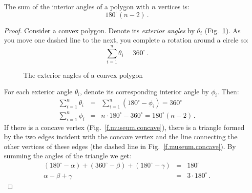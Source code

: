 \begin{theorem}\label{thm.interior-angles-of-a-polygon}
The sum of the interior angles of a polygon with $n$ vertices is:
\[180^\circ(n-2)\,.\]
\end{theorem}
\begin{proof}
Consider a convex polygon.
Denote its \emph{exterior angles} by $\theta_i$ (Fig.~\ref{f.museum.exterior}).
As you move one dashed line to the next, you complete a rotation around a circle so:
\[
\sum_{i=1}^n \theta_i = 360^\circ\,.
\]
\begin{figure}[t]
\begin{center}
\end{center}
\caption{The exterior angles of a convex polygon}\label{f.museum.exterior}
\end{figure}
For each exterior angle $\theta_i$, denote its corresponding interior angle by $\phi_i$. Then:
\begin{eqnarray*}
\displaystyle\sum_{i=1}^n \theta_i &=&\displaystyle\sum_{i=1}^n (180^\circ-\phi_i)= 360^\circ\\
\displaystyle\sum_{i=1}^n \phi_i &=& n\cdot 180^\circ-360^\circ =180^\circ(n-2)\,.
\end{eqnarray*}
If there is a concave vertex (Fig.~\ref{f.museum.concave}), there is a triangle formed by the two edges incident with the concave vertex and the line connecting the other vertices of these edges (the dashed line in Fig.~\ref{f.museum.concave}). By summing the angles of the triangle we get:
\begin{eqnarray*}
(180^\circ - \alpha) + (360^\circ - \beta) + (180^\circ - \gamma) &=& 180^\circ\\
\alpha + \beta + \gamma &=& 3\cdot 180^\circ\,.
\end{eqnarray*}


\end{proof}

